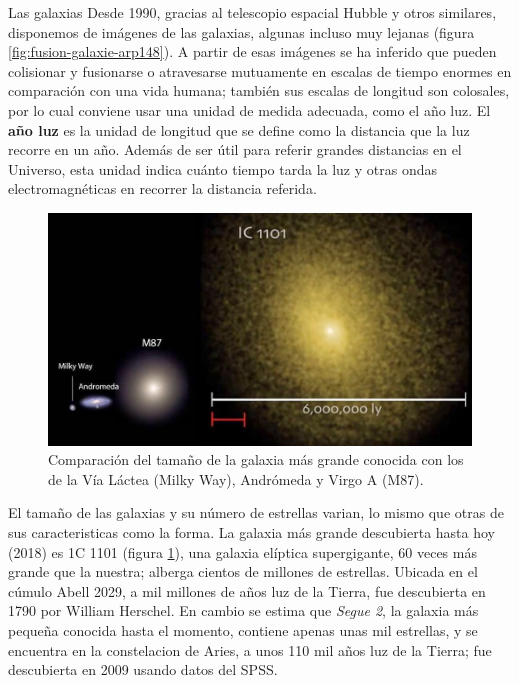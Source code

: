 \documentclass[12pt,addpoints]{guia}
\begin{document}
\begin{sectionbox}{Las galaxias}
    Desde 1990, gracias al telescopio espacial Hubble y otros
    similares, disponemos de imágenes de las galaxias, algunas
    incluso muy lejanas (figura \ref{fig:fusion-galaxie-arp148}). A partir de esas imágenes se ha inferido que pueden colisionar y fusionarse o atravesarse mutuamente en escalas de tiempo enormes en comparación
    con una vida humana; también sus escalas de
    longitud son colosales, por lo cual conviene usar una unidad de medida adecuada, como el año luz.
    \label{085a_b}El \textbf{año luz} es la unidad de \label{085a_c} longitud que se define como la distancia que la luz recorre en un año. Además de ser útil para
    referir grandes distancias en el Universo, esta unidad indica
    cuánto tiempo tarda la luz y otras ondas electromagnéticas
    en recorrer la distancia referida.
    \begin{figure}
        \centering
        \includegraphics[width=\linewidth]{../images/10301186_1559077347670728_4400880990486792799_n.jpg}
        \caption{Comparación del tamaño de la galaxia más
            grande conocida con los de la Vía Láctea (Milky Way), Andrómeda y Virgo A (M87).}
        \label{fig:10301186_1559077347670728_4400880990486792799_n}
    \end{figure}

    El tamaño de las galaxias y su número de estrellas varian, lo mismo que otras de sus caracteristicas como la forma.
    La galaxia más grande descubierta hasta hoy (2018) es 1C 1101 (figura \ref{fig:10301186_1559077347670728_4400880990486792799_n}), una galaxia elíptica supergigante, 60 veces más grande que la nuestra; alberga cientos de millones de estrellas. Ubicada en el cúmulo Abell 2029, a mil millones de años luz de la Tierra, fue descubierta en 1790 por William Herschel.
    En cambio se estima que \emph{Segue 2}, la galaxia más pequeña conocida hasta el momento, contiene apenas unas mil estrellas, y se encuentra en la constelacion de Aries, a unos 110 mil años luz de la Tierra; fue descubierta en 2009 usando datos del SPSS.


\end{sectionbox}
\end{document}
